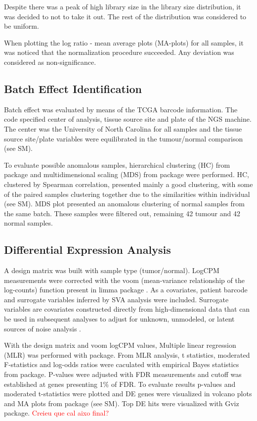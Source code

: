 \documentclass[9pt,twocolumn,twoside]{gsajnl}
\begin{document}
Despite there was a peak of high library size in the library size distribution, it was decided to not to take it out. The rest of the distribution was considered to be uniform.

When plotting the log ratio - mean average plots (MA-plots) for all samples, it was noticed that the normalization procedure succeeded. Any deviation was considered as non-significance.

\subsection*{Batch Effect Identification}

Batch effect was evaluated by means of the TCGA barcode information. The code specified center of analysis, tissue source site and plate of the NGS machine. The center was the University of North Carolina for all samples and the tissue source site/plate variables were equilibrated in the tumour/normal comparison (see SM).

To evaluate possible anomalous samples, hierarchical clustering (HC) from \cite{pheatmap} package and multidimensional scaling (MDS) from \cite{limma} package were performed. HC, clustered by Spearman correlation, presented mainly a good clustering, with some of the paired samples clustering together due to the similarities within individual (see SM). MDS plot presented an anomalous clustering of normal samples from the same batch. These samples were filtered out, remaining 42 tumour and 42 normal samples.



\subsection*{Differential Expression Analysis}

A design matrix was built with sample type (tumor/normal). LogCPM measurements were corrected with the  voom (mean-variance relationship of the log-counts) function present in limma package \cite{voom}. As a covariates,  patient barcode and surrogate variables inferred by SVA analysis were included. Surrogate variables are covariates constructed directly from high-dimensional data that can be used in subsequent analyses to adjust for unknown, unmodeled, or latent sources of noise analysis \cite{GSVA}.

With the design matrix and voom logCPM values, Multiple linear regression (MLR) was performed with \cite{limma} package. From MLR analysis, t statistics, moderated F-statistics and  log-odds ratios were caculated with empirical Bayes statistics from \cite{limma} package. P-values were adjusted with FDR measurements and cutoff was established at genes presenting 1\% of FDR. To evaluate results p-values and moderated t-statistics were plotted and DE genes were visualized in volcano plots and  MA plots  from \cite{limma} package (see SM). Top DE hits were visualized with Gviz package. \textcolor{red}{Creieu que cal aixo final?}
\end{document}
